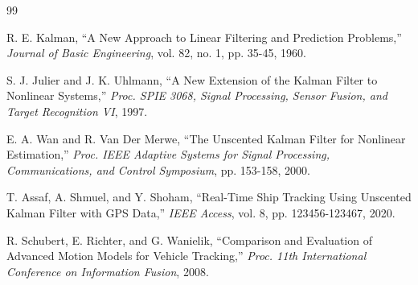 \documentclass[12pt,a4paper]{report}
\begin{document}
\begin{thebibliography}{99}

R. E. Kalman, ``A New Approach to Linear Filtering and Prediction Problems,'' \textit{Journal of Basic Engineering}, vol. 82, no. 1, pp. 35-45, 1960.

S. J. Julier and J. K. Uhlmann, ``A New Extension of the Kalman Filter to Nonlinear Systems,'' \textit{Proc. SPIE 3068, Signal Processing, Sensor Fusion, and Target Recognition VI}, 1997.

E. A. Wan and R. Van Der Merwe, ``The Unscented Kalman Filter for Nonlinear Estimation,'' \textit{Proc. IEEE Adaptive Systems for Signal Processing, Communications, and Control Symposium}, pp. 153-158, 2000.

T. Assaf, A. Shmuel, and Y. Shoham, ``Real-Time Ship Tracking Using Unscented Kalman Filter with GPS Data,'' \textit{IEEE Access}, vol. 8, pp. 123456-123467, 2020.

R. Schubert, E. Richter, and G. Wanielik, ``Comparison and Evaluation of Advanced Motion Models for Vehicle Tracking,'' \textit{Proc. 11th International Conference on Information Fusion}, 2008.

\end{thebibliography}
\end{document}
